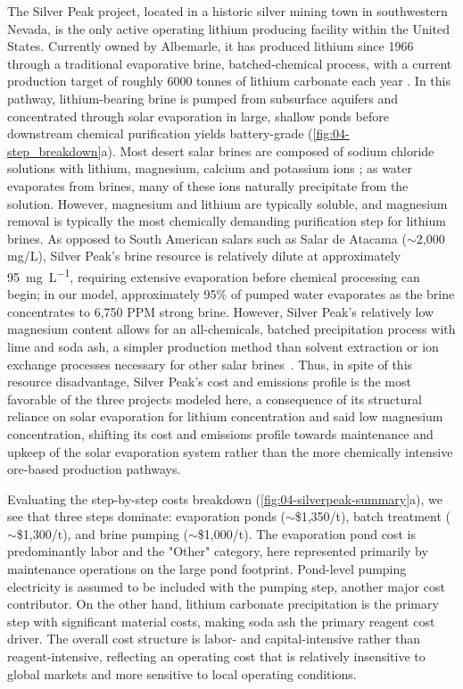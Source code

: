 The Silver Peak project, located in a historic silver mining town in southwestern Nevada, is the only active operating lithium producing facility within the United States. Currently owned by Albemarle, it has produced lithium since 1966 through a traditional evaporative brine, batched-chemical process, with a current production target of roughly 6000 tonnes of lithium carbonate each year \cite{srkconsultingSECTechnicalReport2023a}. In this pathway, lithium-bearing brine is pumped from subsurface aquifers and concentrated through solar evaporation in large, shallow ponds before downstream chemical purification yields battery-grade  (\ref{fig:04-step_breakdown}a). Most desert salar brines are composed of sodium chloride solutions with lithium, magnesium, calcium and potassium ions \cite{garrettHandbookLithiumNatural2004}; as water evaporates from brines, many of these ions naturally precipitate from the solution. However, magnesium and lithium are typically soluble, and magnesium removal is typically the most chemically demanding purification step for lithium brines\cite{torresSalarAtacamaLithium2024, flemingLongrunAvailabilityMineral2024}. As opposed to South American salars such as Salar de Atacama ($\sim$2,000 mg/L), Silver Peak's brine resource is relatively dilute at approximately \qty{95}{\mg\per\L}, requiring extensive evaporation before chemical processing can begin; in our model, approximately 95\% of pumped water evaporates as the brine concentrates to 6,750 PPM strong brine. However, Silver Peak's relatively low magnesium content allows for an all-chemicals, batched precipitation process with lime and soda ash, a simpler production method than solvent extraction or ion exchange processes necessary for other salar brines~\cite{srkconsultingSECTechnicalReport2023a, flexerLithiumRecoveryBrines2018}. Thus, in spite of this resource disadvantage, Silver Peak's cost and emissions profile is the most favorable of the three projects modeled here, a consequence of its structural reliance on solar evaporation for lithium concentration and said low magnesium concentration, shifting its cost and emissions profile towards maintenance and upkeep of the solar evaporation system rather than the more chemically intensive ore-based production pathways.

Evaluating the step-by-step costs breakdown (\ref{fig:04-silverpeak-summary}a), we see that three steps dominate: evaporation ponds ($\sim$\$1,350/t), batch treatment ($\sim$\$1,300/t), and brine pumping ($\sim$\$1,000/t). The evaporation pond cost is predominantly labor and the "Other" category, here represented primarily by maintenance operations on the large pond footprint. Pond-level pumping electricity is assumed to be included with the pumping step, another major cost contributor. On the other hand, lithium carbonate precipitation is the primary step with significant material costs, making soda ash the primary reagent cost driver. The overall cost structure is labor- and capital-intensive rather than reagent-intensive, reflecting an operating cost that is relatively insensitive to global markets and more sensitive to local operating conditions.

